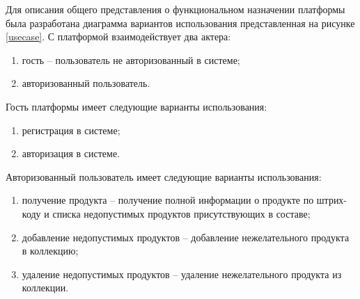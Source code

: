 Для описания общего представления о функциональном назначении
платформы была разработана диаграмма вариантов использования представленная на рисунке \ref{usecase}. С платформой взаимодействует два актера:
\begin{enumerate}
	\item гость -- пользователь не авторизованный в системе;
	\item авторизованный пользователь. 
\end{enumerate}
Гость платформы имеет следующие варианты использования:
\begin{enumerate}
	\item регистрация в системе;
	\item  авторизация в системе.
\end{enumerate}
Авторизованный пользователь имеет следующие варианты использования:
\begin{enumerate}
	\item получение продукта -- получение полной информации о продукте по штрих-коду и списка недопустимых продуктов присутствующих в составе;
	\item добавление недопустимых продуктов -- добавление нежелательного продукта в коллекцию;
	\item удаление недопустимых продуктов -- удаление нежелательного продукта из коллекции.
\end{enumerate}

